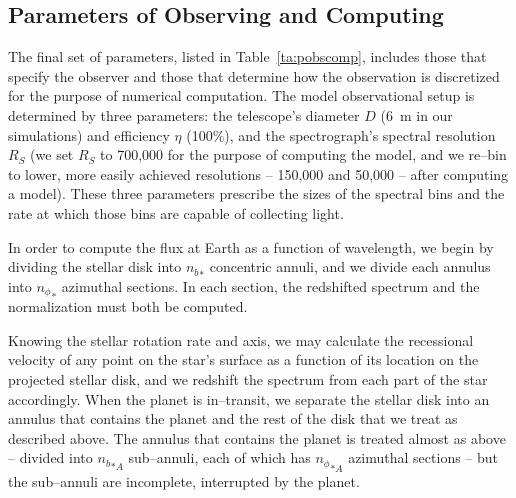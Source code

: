 \subsection{Parameters of Observing and Computing}
\label{rot_ssec:pobscomp}
The final set of parameters, listed in Table~\ref{ta:pobscomp},
includes those that specify the observer and those that determine how
the observation is discretized for the purpose of numerical
computation.  The model observational setup is determined by three
parameters: the telescope's diameter $D$ (6~m in our simulations) and
efficiency $\eta$ (100\%), and the spectrograph's spectral resolution
$R_S$ (we set $R_S$ to 700,000 for the purpose of computing the model,
and we re--bin to lower, more easily achieved resolutions -- 150,000
and 50,000 -- after computing a model).  These three parameters
prescribe the sizes of the spectral bins and the rate at which those
bins are capable of collecting light.

In order to compute the flux at Earth as a function of wavelength, we
begin by dividing the stellar disk into ${n_b}_*$ concentric annuli,
and we divide each annulus into ${n_\phi}_*$ azimuthal sections.  In
each section, the redshifted spectrum and the normalization must both
be computed.

Knowing the stellar rotation rate and axis, we may calculate the
recessional velocity of any point on the star's surface as a function
of its location on the projected stellar disk, and we redshift the
spectrum from each part of the star accordingly.  When the planet is
in--transit, we separate the stellar disk into an annulus that
contains the planet and the rest of the disk that we treat as
described above.  The annulus that contains the planet is treated
almost as above -- divided into ${n_b}_{*A}$ sub--annuli, each of
which has ${n_\phi}_{*A}$ azimuthal sections -- but the sub--annuli
are incomplete, interrupted by the planet.


